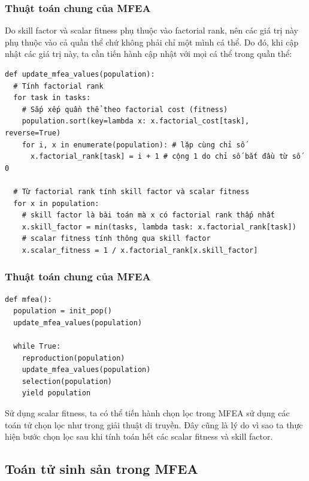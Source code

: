 \begin{frame}[fragile]
\frametitle{Thuật toán chung của MFEA}
Do skill factor và scalar fitness phụ thuộc vào factorial rank, nên các giá trị
này phụ thuộc vào cả quần thể chứ không phải chỉ một mình cá thể. Do đó, khi cập
nhật các giá trị này, ta cần tiến hành cập nhật với mọi cá thể trong quần thể:
\begin{verbatim}
def update_mfea_values(population):
  # Tính factorial rank
  for task in tasks:
    # Sắp xếp quần thể theo factorial cost (fitness)
    population.sort(key=lambda x: x.factorial_cost[task], reverse=True)
    for i, x in enumerate(population): # lặp cùng chỉ số
      x.factorial_rank[task] = i + 1 # cộng 1 do chỉ số bắt đầu từ số 0

  # Từ factorial rank tính skill factor và scalar fitness
  for x in population:
    # skill factor là bài toán mà x có factorial rank thấp nhất
    x.skill_factor = min(tasks, lambda task: x.factorial_rank[task])
    # scalar fitness tính thông qua skill factor
    x.scalar_fitness = 1 / x.factorial_rank[x.skill_factor]
\end{verbatim}
\end{frame}

\begin{frame}[fragile]
\frametitle{Thuật toán chung của MFEA}
\begin{verbatim}
def mfea():
  population = init_pop()
  update_mfea_values(population)

  while True:
    reproduction(population)
    update_mfea_values(population)
    selection(population)
    yield population
\end{verbatim}

Sử dụng scalar fitness, ta có thể tiến hành chọn lọc trong MFEA sử dụng các toán
tử chọn lọc như trong giải thuật di truyền. Đây cũng là lý do vì sao ta thực
hiện bước chọn lọc sau khi tính toán hết các scalar fitness và skill factor.
\end{frame}


\subsection{Toán tử sinh sản trong MFEA} %
\label{sub:Toán tử sinh sản trong MFEA}

